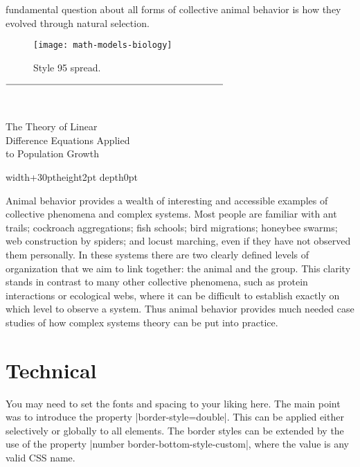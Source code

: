  fundamental question about all forms of  collective animal behavior is how they evolved through natural selection. 


\begin{figure}[ht]
\centering
\texttt{[image: math-models-biology]}
\caption{Style 95 spread.}
\end{figure}

\newcommand\croc[2][]{%
\bgroup
\parindent0pt\leftskip-20pt
\def\x{\vrule width\dimexpr\textwidth-200pt\relax height1pt\\ }
\mbox{\HUGE\hspace*{20pt}\thechapter\hspace*{20pt}}\Huge $\overline{\text{\vrule height22pt width0pt\relax  \phantom{The Theory of Linear}\hspace*{130pt}}}$\par
\parindent65pt
\vspace*{-\baselineskip}
{\color{spot!50}#2}\par
\smallskip

\parindent0pt\leftskip-30pt
\vrule width\dimexpr\textwidth+30pt\relax height2pt depth0pt\relax\par
\egroup
{}
\bigskip
}

\croc[Testing]{The Theory of Linear\\Difference Equations Applied\\ to Population Growth}


Animal behavior provides a wealth of interesting and accessible examples
of collective phenomena and complex systems. Most people are
familiar with ant trails; cockroach aggregations; fish schools; bird migrations;
honeybee swarms; web construction by spiders; and locust marching,
even if they have not observed them personally. In these systems
there are two clearly defined levels of organization that we aim to link
together: the animal and the group. This clarity stands in contrast to
many other collective phenomena, such as protein interactions or ecological
webs, where it can be difficult to establish exactly on which level
to observe a system. Thus animal behavior provides much needed case
studies of how complex systems theory can be put into practice. 

\section{Technical}

You may need to set the fonts and spacing to your liking here. The main point was to introduce the property
|border-style=double|. This can be applied either selectively or globally to all elements. The border styles can be extended by the use of the property |number border-bottom-style-custom|, where the value is 
any valid CSS name. 

